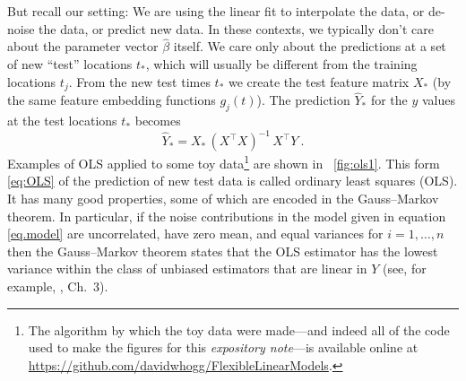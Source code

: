 \documentclass[12pt,letterpaper]{article}
\newcommand{\documentname}{\textsl{expository note}}
\begin{document}
But recall our setting:
We are using the linear fit to interpolate the data, or de-noise the data, or predict new data.
In these contexts, we typically don't care about the parameter vector $\hat{\beta}$ itself.
We care only about the predictions at a set of new ``test'' locations $t_\ast$, which will usually be different from the training locations $t_j$.
From the new test times $t_\ast$ we create the test feature matrix $X_\ast$ (by the same feature embedding functions $g_j(t)$).
The prediction $\hat{Y}_\ast$ for the $y$ values at the test locations $t_\ast$ becomes
\begin{equation}\label{eq:OLS}
    \hat{Y}_\ast = X_\ast\,(X^\top X)^{-1}\,X^\top Y
    ~.
\end{equation}
Examples of OLS applied to some toy data\footnote{The algorithm by which the toy data were made---and indeed all of the code used to make the figures for this \documentname---is available online at \url{https://github.com/davidwhogg/FlexibleLinearModels}.} are shown in \figurename~\ref{fig:ols1}.
This form \eqref{eq:OLS} of the prediction of new test data is called ordinary least squares (OLS). It has many good properties, some of which are encoded in the Gauss--Markov theorem.
In particular, if the noise contributions in the model given in equation \eqref{eq.model} are uncorrelated, have zero mean, and equal variances for $i=1,\ldots, n$ then the Gauss--Markov theorem states that the OLS estimator has the lowest variance within the class of unbiased estimators that are linear in $Y$ (see, for example, \citealt{esl}, Ch.~3).
\end{document}
